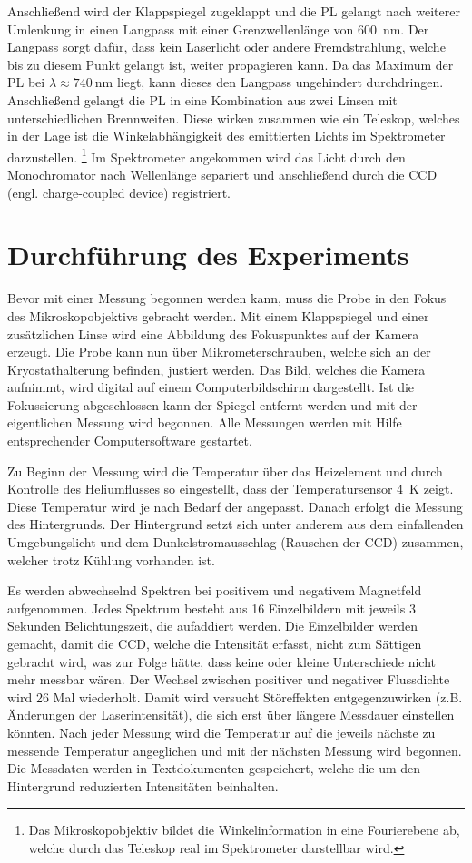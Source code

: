Anschließend wird der Klappspiegel zugeklappt und die PL gelangt nach weiterer Umlenkung in einen 
Langpass mit einer Grenzwellenlänge von \SI{600}{\nano\meter}. 
Der Langpass sorgt dafür, dass kein Laserlicht oder andere Fremdstrahlung,
welche bis zu diesem Punkt gelangt ist, weiter propagieren kann. 
Da das Maximum der PL bei $\lambda \approx \SI{740}{\nano\meter}$ liegt, 
kann dieses den Langpass ungehindert durchdringen.
Anschließend gelangt die PL in eine Kombination aus zwei Linsen mit unterschiedlichen Brennweiten.
Diese wirken zusammen wie ein Teleskop, welches in der Lage ist die Winkelabhängigkeit des emittierten Lichts 
im Spektrometer darzustellen.
\footnote{Das Mikroskopobjektiv bildet die Winkelinformation in eine Fourierebene ab,
welche durch das Teleskop real im Spektrometer darstellbar wird.} 
Im Spektrometer angekommen wird das Licht durch den Monochromator nach Wellenlänge separiert und 
anschließend durch die CCD (engl. charge-coupled device) registriert.

\section{Durchführung des Experiments}
Bevor mit einer Messung begonnen werden kann, muss die Probe in den Fokus des Mikroskopobjektivs 
gebracht werden. 
Mit einem Klappspiegel und einer zusätzlichen Linse wird eine Abbildung des 
Fokuspunktes auf der Kamera erzeugt. 
Die Probe kann nun über Mikrometerschrauben, welche sich an der 
Kryostathalterung befinden, justiert werden.
Das Bild, welches die Kamera aufnimmt, wird digital auf einem Computerbildschirm dargestellt. 
Ist die Fokussierung abgeschlossen kann der Spiegel entfernt werden und mit der eigentlichen Messung 
wird begonnen.
Alle Messungen werden mit Hilfe entsprechender Computersoftware gestartet.

Zu Beginn der Messung wird die Temperatur 
über das Heizelement und durch 
Kontrolle des Heliumflusses so eingestellt, dass der Temperatursensor \SI{4}{\kelvin} zeigt. 
Diese Temperatur wird je nach Bedarf der angepasst.
Danach erfolgt die Messung des Hintergrunds.
Der Hintergrund setzt sich unter anderem aus dem einfallenden Umgebungslicht und 
dem Dunkelstromausschlag (Rauschen der CCD) zusammen, welcher trotz Kühlung vorhanden ist.
 
Es werden abwechselnd Spektren bei positivem und negativem Magnetfeld aufgenommen. 
Jedes Spektrum besteht aus 16 Einzelbildern mit jeweils 3 Sekunden Belichtungszeit, die aufaddiert werden.
Die Einzelbilder werden gemacht, damit die CCD, welche die Intensität erfasst, nicht zum Sättigen 
gebracht wird, was zur Folge hätte, dass keine oder kleine Unterschiede nicht mehr messbar wären.
Der Wechsel zwischen positiver und negativer Flussdichte wird 26 Mal wiederholt. Damit 
wird versucht Störeffekten entgegenzuwirken (z.B. Änderungen der Laserintensität), die sich erst über 
längere Messdauer einstellen könnten.
Nach jeder Messung wird die Temperatur auf die jeweils nächste zu messende Temperatur angeglichen
und mit der nächsten Messung wird begonnen.
Die Messdaten werden in Textdokumenten gespeichert, welche die um den Hintergrund 
reduzierten Intensitäten beinhalten.

